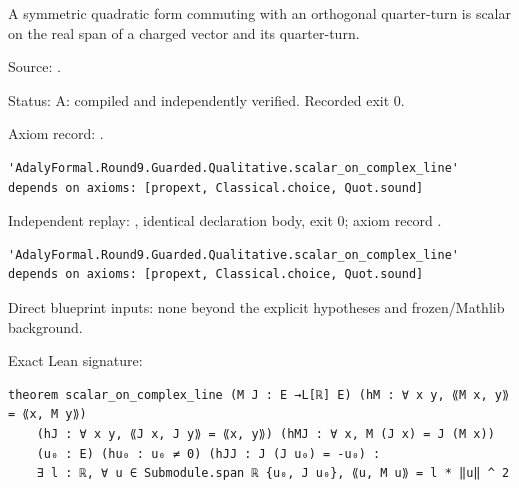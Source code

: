 \begin{theorem}[bp-103]
\label{bp-103}
\uses{}
\leanok
A symmetric quadratic form commuting with an orthogonal quarter-turn is scalar on the real span of a charged vector and its quarter-turn.

\par Source: \texttt{}.
\par Status: A: compiled and independently verified. Recorded exit 0.
\par Axiom record: \texttt{}.
\begin{verbatim}
'AdalyFormal.Round9.Guarded.Qualitative.scalar_on_complex_line' depends on axioms: [propext, Classical.choice, Quot.sound]
\end{verbatim}
\par Independent replay: \texttt{}, identical declaration body, exit 0; axiom record \texttt{}.
\begin{verbatim}
'AdalyFormal.Round9.Guarded.Qualitative.scalar_on_complex_line' depends on axioms: [propext, Classical.choice, Quot.sound]
\end{verbatim}
\par Direct blueprint inputs: none beyond the explicit hypotheses and frozen/Mathlib background.
\par Exact Lean signature:
\begin{verbatim}
theorem scalar_on_complex_line (M J : E →L[ℝ] E) (hM : ∀ x y, ⟪M x, y⟫ = ⟪x, M y⟫)
    (hJ : ∀ x y, ⟪J x, J y⟫ = ⟪x, y⟫) (hMJ : ∀ x, M (J x) = J (M x))
    (u₀ : E) (hu₀ : u₀ ≠ 0) (hJJ : J (J u₀) = -u₀) :
    ∃ l : ℝ, ∀ u ∈ Submodule.span ℝ {u₀, J u₀}, ⟪u, M u⟫ = l * ‖u‖ ^ 2
\end{verbatim}
\end{theorem}

